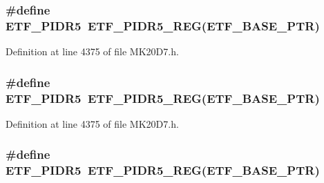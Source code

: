 \subsubsection[{\texorpdfstring{E\+T\+F\+\_\+\+P\+I\+D\+R5}{ETF_PIDR5}}]{\setlength{\rightskip}{0pt plus 5cm}\#define E\+T\+F\+\_\+\+P\+I\+D\+R5~{\bf E\+T\+F\+\_\+\+P\+I\+D\+R5\+\_\+\+R\+EG}({\bf E\+T\+F\+\_\+\+B\+A\+S\+E\+\_\+\+P\+TR})}\hypertarget{group___e_t_f___register___accessor___macros_gaaaf5d14c92bbebb88933db501e20a1b0}{}\label{group___e_t_f___register___accessor___macros_gaaaf5d14c92bbebb88933db501e20a1b0}


Definition at line 4375 of file M\+K20\+D7.\+h.

\subsubsection[{\texorpdfstring{E\+T\+F\+\_\+\+P\+I\+D\+R5}{ETF_PIDR5}}]{\setlength{\rightskip}{0pt plus 5cm}\#define E\+T\+F\+\_\+\+P\+I\+D\+R5~{\bf E\+T\+F\+\_\+\+P\+I\+D\+R5\+\_\+\+R\+EG}({\bf E\+T\+F\+\_\+\+B\+A\+S\+E\+\_\+\+P\+TR})}\hypertarget{group___e_t_f___register___accessor___macros_gaaaf5d14c92bbebb88933db501e20a1b0}{}\label{group___e_t_f___register___accessor___macros_gaaaf5d14c92bbebb88933db501e20a1b0}


Definition at line 4375 of file M\+K20\+D7.\+h.

\subsubsection[{\texorpdfstring{E\+T\+F\+\_\+\+P\+I\+D\+R5}{ETF_PIDR5}}]{\setlength{\rightskip}{0pt plus 5cm}\#define E\+T\+F\+\_\+\+P\+I\+D\+R5~{\bf E\+T\+F\+\_\+\+P\+I\+D\+R5\+\_\+\+R\+EG}({\bf E\+T\+F\+\_\+\+B\+A\+S\+E\+\_\+\+P\+TR})}\hypertarget{group___e_t_f___register___accessor___macros_gaaaf5d14c92bbebb88933db501e20a1b0}{}\label{group___e_t_f___register___accessor___macros_gaaaf5d14c92bbebb88933db501e20a1b0}


